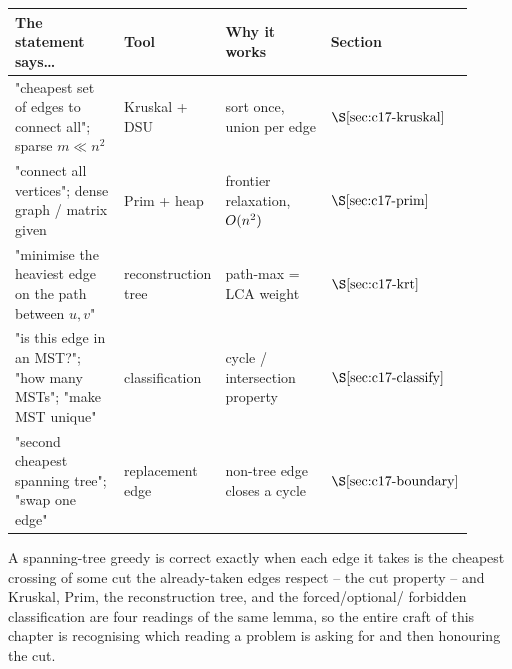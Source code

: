 \begin{center}
\renewcommand{\arraystretch}{1.25}
\setlength{\tabcolsep}{3pt}
\begin{tabular}{@{}p{0.30\linewidth} p{0.20\linewidth} p{0.28\linewidth} >{\raggedright\arraybackslash}p{0.13\linewidth}@{}}
\toprule
\textbf{The statement says\dots} & \textbf{Tool} & \textbf{Why it works} & \textbf{Section}\\
\midrule
"cheapest set of edges to connect all"; sparse \(m\ll n^2\) & Kruskal + DSU & sort once, union per edge & \(\secref{c17-kruskal}\)\\
"connect all vertices"; dense graph / matrix given & Prim + heap & frontier relaxation, \(O(n^2)\) & \(\secref{c17-prim}\)\\
"minimise the heaviest edge on the path between \(u,v\)" & reconstruction tree & path-max = LCA weight & \(\secref{c17-krt}\)\\
"is this edge in an MST?"; "how many MSTs"; "make MST unique" & classification & cycle / intersection property & \(\secref{c17-classify}\)\\
"second cheapest spanning tree"; "swap one edge" & replacement edge & non-tree edge closes a cycle & \(\secref{c17-boundary}\)\\
\bottomrule
\end{tabular}
\end{center}

\begin{insightbox}
A spanning-tree greedy is correct exactly when each edge it takes is the
cheapest crossing of some cut the already-taken edges respect -- the cut
property -- and Kruskal, Prim, the reconstruction tree, and the forced/optional/
forbidden classification are four readings of the same lemma, so the entire craft
of this chapter is recognising which reading a problem is asking for and then
honouring the cut.
\end{insightbox}

